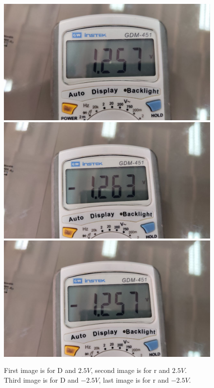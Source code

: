 \documentclass[11pt]{article}
\begin{document}
\begin{question}
\begin{subquestion}
{\begin{figure}[H]
                \includegraphics[scale=0.08,angle=0]{Fig/21.jpeg}
                \includegraphics[scale=0.08,angle=0]{Fig/22.jpeg}
                \includegraphics[scale=0.08,angle=0]{Fig/23.jpeg}
                \caption{First image is for D and $2.5V$, second image is for r and $2.5V$. \\
                \hspace*{14mm} Third image is for D and $-2.5V$, last image is for r and $-2.5V$.}
            \end{figure}

}
\end{subquestion}
\end{question}
\end{document}
